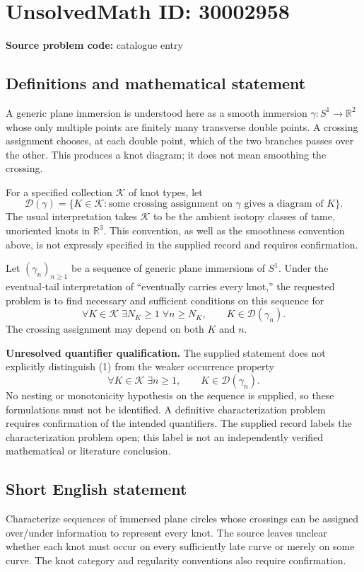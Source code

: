 \documentclass[11pt]{article}
\newcommand{\R}{\mathbb{R}}
\begin{document}
\section*{UnsolvedMath ID: 30002958}
\textbf{Source problem code:} catalogue entry
\subsection{Definitions and mathematical statement}
A generic plane immersion is understood here as a smooth immersion \(\gamma:S^1\to\R^2\) whose only multiple points are finitely many transverse double points. A crossing assignment chooses, at each double point, which of the two branches passes over the other. This produces a knot diagram; it does not mean smoothing the crossing.

For a specified collection \(\mathscr K\) of knot types, let
\[
\mathcal D(\gamma)=\{K\in\mathscr K: \text{some crossing assignment on }\gamma\text{ gives a diagram of }K\}.
\]
The usual interpretation takes \(\mathscr K\) to be the ambient isotopy classes of tame, unoriented knots in \(\R^3\). This convention, as well as the smoothness convention above, is not expressly specified in the supplied record and requires confirmation.

Let \((\gamma_n)_{n\geq 1}\) be a sequence of generic plane immersions of \(S^1\). Under the eventual-tail interpretation of ``eventually carries every knot,'' the requested problem is to find necessary and sufficient conditions on this sequence for
\[
\forall K\in\mathscr K\;\exists N_K\geq 1\;\forall n\geq N_K,
\qquad K\in\mathcal D(\gamma_n).
\tag{1}
\]
The crossing assignment may depend on both \(K\) and \(n\).

\textbf{Unresolved quantifier qualification.} The supplied statement does not explicitly distinguish (1) from the weaker occurrence property
\[
\forall K\in\mathscr K\;\exists n\geq 1,
\qquad K\in\mathcal D(\gamma_n).
\tag{2}
\]
No nesting or monotonicity hypothesis on the sequence is supplied, so these formulations must not be identified. A definitive characterization problem requires confirmation of the intended quantifiers. The supplied record labels the characterization problem open; this label is not an independently verified mathematical or literature conclusion.
\subsection{Short English statement}
Characterize sequences of immersed plane circles whose crossings can be assigned over/under information to represent every knot. The source leaves unclear whether each knot must occur on every sufficiently late curve or merely on some curve. The knot category and regularity conventions also require confirmation.
\end{document}
